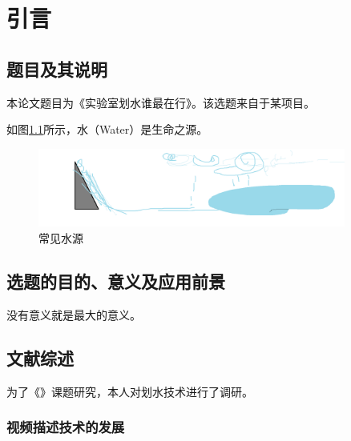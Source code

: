 \chapter{引言}

\section{题目及其说明}

本论文题目为《实验室划水谁最在行》。该选题来自于某项目。

如图\ref{fig:water}所示，水（Water）\cite{water}是生命之源。

\begin{figure}[htb]
    \centering
    \includegraphics[width=0.9\textwidth]{image/water.png}
    \caption{常见水源}
    \label{fig:water}
\end{figure}


\section{选题的目的、意义及应用前景}

没有意义就是最大的意义。

\section{文献综述}

为了《》课题研究，本人对划水技术进行了调研。

\subsection{视频描述技术的发展}


